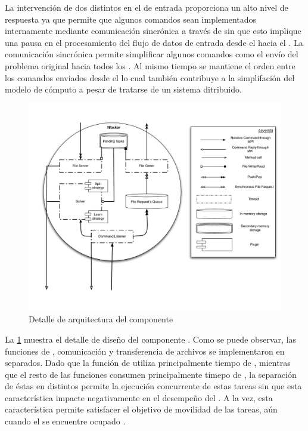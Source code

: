 La intervención de dos \threads distintos en el \datapath de entrada
proporciona un alto nivel de respuesta ya que permite que algunos comandos
sean implementados internamente mediante comunicación sincrónica a través de
\mpi sin que esto implique una pausa en el procesamiento del flujo de datos de
entrada desde el \fend hacia el \bend. La comunicación sincrónica permite
simplificar algunos comandos como el envío del problema original hacia todos
los \ws. Al mismo tiempo se mantiene el orden entre los comandos enviados
desde el \fend lo cual también contribuye a la simplifación del modelo de
cómputo a pesar de tratarse de un sistema ditribuido.

\begin{figure}
\centering
\includegraphics[scale=0.3]{graphs/worker detail}
\caption{Detalle de arquitectura del componente \w}
\label{fig:workerdetail}
\end{figure}

La \fig\ref{fig:workerdetail} muestra el detalle de diseño del componente
\w. Como se puede observar, las funciones de \solving, comunicación y
transferencia de archivos se implementaron en \threads separados. Dado que la
función de \solving utiliza principalmente tiempo de \cpu, mientras que el
resto de las funciones consumen principalmente timepo de \io, la separación de
éstas en distintos \threads permite la ejecución concurrente de estas
tareas sin que esta característica impacte negativamente en el desempeño del
\ssolver. A la vez, esta característica permite satisfacer el objetivo de
movilidad de las tareas, aún cuando el \w se encuentre ocupado \solveando.

